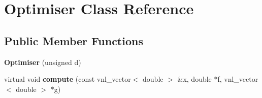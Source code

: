 \hypertarget{classOptimiser}{
\section{Optimiser Class Reference}
\label{classOptimiser}
}
\subsection*{Public Member Functions}
\begin{DoxyCompactItemize}
\item 
\hypertarget{classOptimiser_a56b5e6bf9f98e398007e38c2fe1907d9}{
{\bfseries Optimiser} (unsigned d)}
\label{classOptimiser_a56b5e6bf9f98e398007e38c2fe1907d9}

\item 
\hypertarget{classOptimiser_a5daca49d20b5c6152e3e382304d008c6}{
virtual void {\bfseries compute} (const vnl\_\-vector$<$ double $>$ \&x, double $\ast$f, vnl\_\-vector$<$ double $>$ $\ast$g)}
\label{classOptimiser_a5daca49d20b5c6152e3e382304d008c6}

\end{DoxyCompactItemize}
